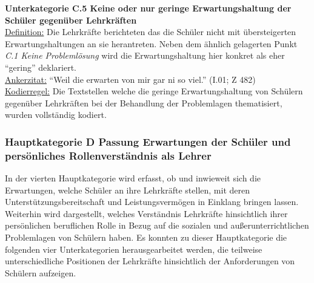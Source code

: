 \textbf{Unterkategorie C.5 Keine oder nur geringe Erwartungshaltung der Schüler gegenüber Lehrkräften}\\
\underline{Definition:} Die Lehrkräfte berichteten das die Schüler nicht mit übersteigerten Erwartungshaltungen an sie herantreten. Neben dem ähnlich gelagerten Punkt \textit{C.1 Keine Problemlösung} wird die Erwartungshaltung hier konkret als eher "`gering"' deklariert.\\
\underline{Ankerzitat:} "`Weil die erwarten von mir gar ni so viel."' (I.01; Z 482)\\
\underline{Kodierregel:} Die Textstellen welche die geringe Erwartungshaltung von Schülern gegenüber Lehrkräften bei der Behandlung der Problemlagen thematisiert, wurden vollständig kodiert.\\

\subsubsection{Hauptkategorie D Passung Erwartungen der Schüler und persönliches Rollenverständnis als Lehrer }
\label{sec:HauptkategorieDPassungErwartungenDerSchülerUndPersönlichesRollenverständnisAlsLehrer}

In der vierten Hauptkategorie wird erfasst, ob und inwieweit sich die Erwartungen, welche Schüler an ihre Lehrkräfte stellen, mit deren Unterstützungsbereitschaft und Leistungsvermögen in Einklang bringen lassen. Weiterhin wird dargestellt, welches Verständnis Lehrkräfte hinsichtlich ihrer persönlichen beruflichen Rolle in Bezug auf die sozialen und außerunterrichtlichen Problemlagen von Schülern haben. Es konnten zu dieser Hauptkategorie die folgenden vier Unterkategorien herausgearbeitet werden, die teilweise unterschiedliche Positionen der Lehrkräfte hinsichtlich der Anforderungen von Schülern aufzeigen.\\

